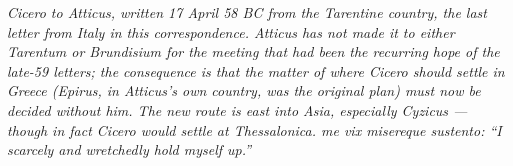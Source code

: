 
\textit{Cicero to Atticus, written 17 April 58 BC from the
Tarentine country, the last letter from Italy in this
correspondence. Atticus has not made it to either Tarentum or
Brundisium for the meeting that had been the recurring hope
of the late-59 letters; the consequence is that the matter
of where Cicero should settle in Greece (Epirus, in Atticus's
own country, was the original plan) must now be decided
without him. The new route is east into Asia, especially
Cyzicus --- though in fact Cicero would settle at
Thessalonica. \textit{me vix misereque sustento}: ``I
scarcely and wretchedly hold myself up.''}
